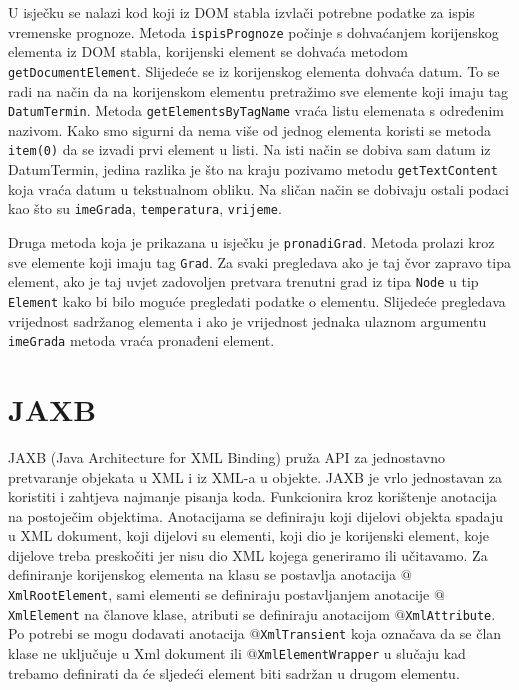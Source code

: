 \documentclass{foi}
\begin{document}
U isječku se nalazi kod koji iz DOM stabla izvlači potrebne podatke za ispis vremenske
prognoze. Metoda \texttt{ispisPrognoze} počinje s dohvaćanjem korijenskog elementa
iz DOM stabla, korijenski element se dohvaća metodom \texttt{getDocumentElement}.
Slijedeće se iz korijenskog elementa dohvaća datum. To se radi na način da na korijenskom
elementu pretražimo sve elemente koji imaju tag \texttt{DatumTermin}.
Metoda \texttt{getElementsByTagName} vraća listu elemenata s određenim nazivom. Kako
smo sigurni da nema više od jednog elementa koristi se metoda \texttt{item(0)}
da se izvadi prvi element u listi. Na isti način se dobiva sam datum iz DatumTermin,
jedina razlika je što na kraju pozivamo metodu \texttt{getTextContent} koja vraća
datum u tekstualnom obliku. Na sličan način se dobivaju ostali podaci kao što su
\texttt{imeGrada}, \texttt{temperatura}, \texttt{vrijeme}.

Druga metoda koja je prikazana u isječku je \texttt{pronadiGrad}. Metoda prolazi kroz
sve elemente koji imaju tag \texttt{Grad}. Za svaki pregledava ako je taj čvor zapravo
tipa element, ako je taj uvjet zadovoljen pretvara trenutni grad iz tipa \texttt{Node}
u tip \texttt{Element} kako bi bilo moguće pregledati podatke o elementu. Slijedeće
pregledava vrijednost sadržanog elementa i ako je vrijednost jednaka ulaznom argumentu
\texttt{imeGrada} metoda vraća pronađeni element.

\section{JAXB}
JAXB (Java Architecture for XML Binding) pruža API za jednostavno pretvaranje objekata
u XML i iz XML-a u objekte. JAXB je vrlo jednostavan za koristiti i zahtjeva najmanje
pisanja koda. Funkcionira kroz korištenje anotacija na postoječim objektima. Anotacijama
se definiraju koji dijelovi objekta spadaju u XML dokument, koji dijelovi su elementi,
koji dio je korijenski element, koje dijelove treba preskočiti jer nisu dio XML kojega
generiramo ili učitavamo. Za definiranje korijenskog elementa na klasu se postavlja
anotacija \texttt{$@$XmlRootElement}, sami elementi se definiraju postavljanjem anotacije
\texttt{$@$XmlElement} na članove klase, atributi se definiraju anotacijom
\texttt{$@$XmlAttribute}. Po potrebi se mogu dodavati anotacija \texttt{$@$XmlTransient}
koja označava da se član klase ne uključuje u Xml dokument ili \texttt{$@$XmlElementWrapper}
u slučaju kad trebamo definirati da će sljedeći element biti sadržan u drugom elementu.
\end{document}
